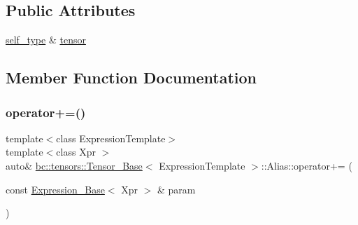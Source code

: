 \subsection*{Public Attributes}
\begin{DoxyCompactItemize}
\item 
\hyperlink{classbc_1_1tensors_1_1Expression__Base}{self\+\_\+type} \& \hyperlink{structbc_1_1tensors_1_1Tensor__Base_1_1Alias_ad5750b0c21936ec7e177648a831d06b4}{tensor}
\end{DoxyCompactItemize}


\subsection{Member Function Documentation}
\mbox{\label{structbc_1_1tensors_1_1Tensor__Base_1_1Alias_aca7a44a5cd4994ecdbc094b092a50879}} 
\subsubsection{\texorpdfstring{operator+=()}{operator+=()}}
{\footnotesize\ttfamily template$<$class Expression\+Template$>$ \\
template$<$class Xpr $>$ \\
auto\& \hyperlink{classbc_1_1tensors_1_1Tensor__Base}{bc\+::tensors\+::\+Tensor\+\_\+\+Base}$<$ Expression\+Template $>$\+::Alias\+::operator+= (\begin{DoxyParamCaption}\item[{const \hyperlink{classbc_1_1tensors_1_1Expression__Base}{Expression\+\_\+\+Base}$<$ Xpr $>$ \&}]{param }\end{DoxyParamCaption})\hspace{0.3cm}{\ttfamily [inline]}}

\mbox{\label{structbc_1_1tensors_1_1Tensor__Base_1_1Alias_ab5c7e5fa42ac5d4dcb1b95325cef5541}} 
